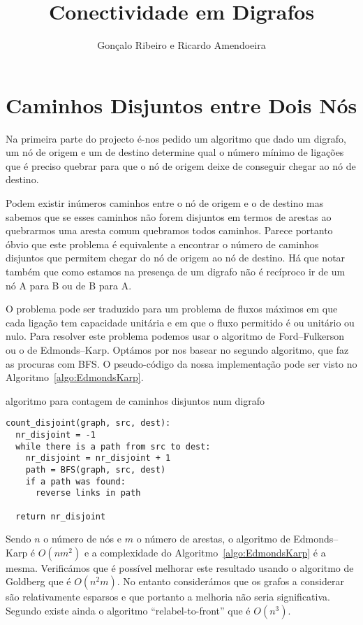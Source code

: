 \documentclass[10pt,a4paper]{article}
\author{Gonçalo Ribeiro e Ricardo Amendoeira}
\title{Conectividade em Digrafos}
\begin{document}

\pagebreak

\section{Caminhos Disjuntos entre Dois Nós}
Na primeira parte do projecto é-nos pedido um algoritmo que dado um digrafo, um nó de origem e um de destino determine qual o número mínimo de ligações que é preciso quebrar para que o nó de origem deixe de conseguir chegar ao nó de destino.

Podem existir inúmeros caminhos entre o nó de origem e o de destino mas sabemos que se esses caminhos não forem disjuntos em termos de arestas ao quebrarmos uma aresta comum quebramos todos caminhos. Parece portanto óbvio que este problema é equivalente a encontrar o número de caminhos disjuntos que permitem chegar do nó de origem ao nó de destino. Há que notar também que como estamos na presença de um digrafo não é recíproco ir de um nó A para B ou de B para A.

O problema pode ser traduzido para um problema de fluxos máximos em que cada ligação tem capacidade unitária e em que o fluxo permitido é ou unitário ou nulo. Para resolver este problema podemos usar o algoritmo de Ford--Fulkerson ou o de Edmonds--Karp. Optámos por nos basear no segundo algoritmo, que faz as procuras com BFS. O pseudo-código da nossa implementação pode ser visto no Algoritmo~\ref{algo:EdmondsKarp}.

\begin{algorithm}[h]
\caption{algoritmo para contagem de caminhos disjuntos num digrafo}
\label{algo:EdmondsKarp}
\begin{lstlisting}[linewidth=0.95\linewidth]
count_disjoint(graph, src, dest):
  nr_disjoint = -1
  while there is a path from src to dest:
    nr_disjoint = nr_disjoint + 1
    path = BFS(graph, src, dest)
    if a path was found:
      reverse links in path

  return nr_disjoint
\end{lstlisting}
\end{algorithm}

Sendo $n$ o número de nós e $m$ o número de arestas, o algoritmo de Edmonds--Karp é $O(n m^2)$ e a complexidade do Algoritmo~\ref{algo:EdmondsKarp} é a mesma. Verificámos que é possível melhorar este resultado usando o algoritmo de Goldberg que é $O(n^2 m)$. No entanto considerámos que os grafos a considerar são relativamente esparsos e que portanto a melhoria não seria significativa. Segundo \cite{IntrotoAlgorithms3rd} existe ainda o algoritmo ``relabel-to-front'' que é $O(n^3)$.
\end{document}
